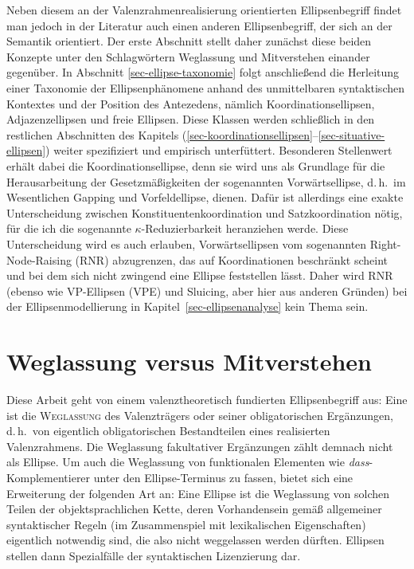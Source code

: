 Neben diesem an der Valenzrahmenrealisierung orientierten Ellipsenbegriff findet man jedoch in der Literatur auch einen anderen Ellipsenbegriff, der sich an der Semantik orientiert. Der erste Abschnitt stellt daher zunächst diese beiden Konzepte unter den Schlagwörtern Weglassung und Mitverstehen einander gegenüber. In Abschnitt \ref{sec-ellipse-taxonomie} folgt anschlie\ss end die Herleitung einer Taxonomie der Ellipsenphänomene anhand des unmittelbaren syntaktischen Kontextes und der Position des Antezedens, nämlich Koordinationsellipsen, Adjazenzellipsen und freie Ellipsen. Diese Klassen werden schließlich in den restlichen Abschnitten des Kapitels (\ref{sec-koordinationsellipsen}--\ref{sec-situative-ellipsen}) weiter spezifiziert und empirisch unterfüttert. Besonderen Stellenwert erhält dabei die Koordinationsellipse, denn sie wird uns als Grundlage für die Herausarbeitung der Gesetzmä\ss igkeiten der sogenannten Vorwärtsellipse, d.\,h.\ im Wesentlichen Gapping und Vorfeldellipse, dienen. Dafür ist allerdings eine exakte Unterscheidung zwischen Konstituentenkoordination und Satzkoordination nötig, für die ich die sogenannte $\kappa$-Reduzierbarkeit heranziehen werde. Diese Unterscheidung wird es auch erlauben, Vorwärtsellipsen vom sogenannten Right-Node-Raising (RNR) abzugrenzen, das auf Koordinationen beschränkt scheint und bei dem sich nicht zwingend eine Ellipse feststellen lässt. Daher wird RNR (ebenso wie VP-Ellipsen (VPE) und Sluicing, aber hier aus anderen Gründen) bei der Ellipsenmodellierung in Kapitel~\ref{sec-ellipsenanalyse} kein Thema sein.       

\section{Weglassung versus Mitverstehen}

Diese Arbeit geht von einem valenztheoretisch fundierten Ellipsenbegriff aus: Eine  ist die \textsc{Weglassung} des Valenzträgers oder seiner obligatorischen Ergänzungen, d.\,h.\ von eigentlich obligatorischen Bestandteilen eines realisierten Valenzrahmens. Die Weglassung fakultativer Ergänzungen zählt demnach nicht als Ellipse. Um auch die Weglassung von funktionalen Elementen wie \emph{dass}-Komplementierer unter den Ellipse-Terminus zu fassen, bietet sich eine Erweiterung der folgenden Art an: Eine Ellipse ist die Weglassung von solchen Teilen der objektsprachlichen Kette, deren Vorhandensein gemäß allgemeiner syntaktischer Regeln (im Zusammenspiel mit lexikalischen Eigenschaften) eigentlich notwendig sind, die also nicht weggelassen werden dürften. Ellipsen stellen dann Spezialfälle der syntaktischen Lizenzierung dar.

